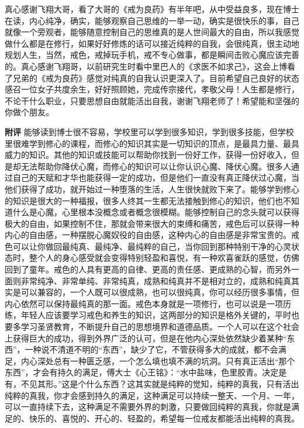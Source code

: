 \begin{case}
    真心感谢飞翔大哥，看了大哥的《戒为良药》有半年吧，从中受益良多，现在博士在读，内心纯净，确实，能够观察自己思维的一举一动，确实是很快乐的事，自己就像一个旁观者，能够随意控制自己的思维真的是人世间最大的自由，所以我感觉做什么都是在修行，如果好好修炼的话可以接近纯粹的自我，会很纯真，很主动地规划人生，当然，戒色，戒掉玩手机，戒不专心做事，都是瞬间击败心魔应该完善的。真心感谢飞翔哥，以前研究生时看中里巴人的《求医不如求己》，这会上博看了兄弟的《戒为良药》感觉对纯真的自我认识更深入了。目前希望自己良好的状态感召一位女子共度余生，好好照顾她，完成传宗接代，孝敬父母！人生都是修行，不论干什么职业，只要思想自由就能活出自我，谢谢飞翔老师了！希望能和坚强的你做个朋友。

    \textbf{附评} 能够读到博士很不容易，学校里可以学到很多知识，学到很多技能，但学校里很难学到修心的课程，而修心的知识其实是一切知识的顶点，是最具力量、最具威力的知识。其他的知识或技能可以帮助你找到一份好工作，获得一份好收入，但是却无法帮助你降伏心魔，而修心的知识可以让你认识心魔、降伏心魔。很多人通过自己的天赋和才华也能获得一定的成功，但是他们一直没有真正降伏过心魔，当他们获得了成功，就开始过一种堕落的生活，人生很快就败下来了。能够学到修心的知识是很大的一种福报，很多人终其一生都无法接触到修心的知识，他们也不知道什么是心魔，心里根本没概念或者概念很模糊。能够控制自己的念头就可以获得极大的自由，如果控制不住，那就会带来很大的束缚和痛苦，戒色后可以获得一种内心的自由感，一种摆脱心魔奴役的自由感，这种内心的自由感是非常宝贵的。戒色可以让你做回最纯真、最纯净、最纯粹的自己，当你回到那种特别干净的心灵状态时，整个人的身心感受就会变得特别轻盈和喜悦，有一种欢喜雀跃的感觉，仿佛回到了童年。戒色的人具有更高的自律、更高的责任感、更成熟的心智，而另外一面则非常纯净、非常单纯、非常纯真，成熟和纯真并不是相对立的，成熟和纯真其实是可以兼容的，一个人既可以很成熟，也可以很纯真，你可以经历很多事情，但内心依然可以保持最纯真的那一面。戒色本身就是一项修行，也可以说是一项历练，年轻人应该要学习戒色和养生的知识，这两部分的知识是格外关键的，平时也要多学习圣贤教育，不断提升自己的思想境界和道德品质。一个人可以在这个社会上获得巨大的成功，得到外界广泛的认可，但是在他内心深处依然缺少着某种“东西”，一种说不清道不明的“东西”，缺少了它，不管获得多大的成就，都不会满足，内心深处总有一种匮乏感，一个怎么填也填不满的坑洞。只有真正活出“那个东西”，才会有持久的满足，傅大士《心王铭》：“水中盐味，色里胶青。决定是有，不见其形。”这是个什么东西？这其实就是纯粹的觉知，纯粹的真我，只有活出纯粹的真我，你才会感到持久的满足，这种满足可以持续一整天、一个月、一年，可以一直持续下去，这种满足不需要外界的刺激，只要做回纯粹的真我，你就是满足的、快乐的、喜悦的、开心的、轻盈的，希望每一位戒友都能活出纯粹的真我。
\end{case}

